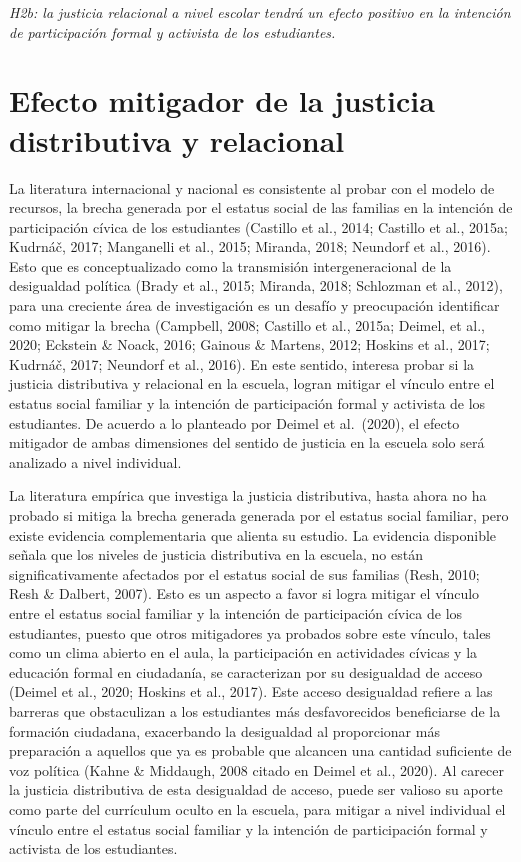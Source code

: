 \documentclass[12pt,twoside]{templates/facsothesis}
\begin{document}
\emph{H2b: la justicia relacional a nivel escolar tendrá un efecto positivo en la intención de participación formal y activista de los estudiantes.}

\hypertarget{efecto-mitigador-de-la-justicia-distributiva-y-relacional}{%
\section{Efecto mitigador de la justicia distributiva y relacional}\label{efecto-mitigador-de-la-justicia-distributiva-y-relacional}}

La literatura internacional y nacional es consistente al probar con el modelo de recursos, la brecha generada por el estatus social de las familias en la intención de participación cívica de los estudiantes (Castillo et al., 2014; Castillo et al., 2015a; Kudrnáč, 2017; Manganelli et al., 2015; Miranda, 2018; Neundorf et al., 2016). Esto que es conceptualizado como la transmisión intergeneracional de la desigualdad política (Brady et al., 2015; Miranda, 2018; Schlozman et al., 2012), para una creciente área de investigación es un desafío y preocupación identificar como mitigar la brecha (Campbell, 2008; Castillo et al., 2015a; Deimel, et al., 2020; Eckstein \& Noack, 2016; Gainous \& Martens, 2012; Hoskins et al., 2017; Kudrnáč, 2017; Neundorf et al., 2016). En este sentido, interesa probar si la justicia distributiva y relacional en la escuela, logran mitigar el vínculo entre el estatus social familiar y la intención de participación formal y activista de los estudiantes. De acuerdo a lo planteado por Deimel et al.~(2020), el efecto mitigador de ambas dimensiones del sentido de justicia en la escuela solo será analizado a nivel individual.

La literatura empírica que investiga la justicia distributiva, hasta ahora no ha probado si mitiga la brecha generada generada por el estatus social familiar, pero existe evidencia complementaria que alienta su estudio. La evidencia disponible señala que los niveles de justicia distributiva en la escuela, no están significativamente afectados por el estatus social de sus familias (Resh, 2010; Resh \& Dalbert, 2007). Esto es un aspecto a favor si logra mitigar el vínculo entre el estatus social familiar y la intención de participación cívica de los estudiantes, puesto que otros mitigadores ya probados sobre este vínculo, tales como un clima abierto en el aula, la participación en actividades cívicas y la educación formal en ciudadanía, se caracterizan por su desigualdad de acceso (Deimel et al., 2020; Hoskins et al., 2017). Este acceso desigualdad refiere a las barreras que obstaculizan a los estudiantes más desfavorecidos beneficiarse de la formación ciudadana, exacerbando la desigualdad al proporcionar más preparación a aquellos que ya es probable que alcancen una cantidad suficiente de voz política (Kahne \& Middaugh, 2008 citado en Deimel et al., 2020). Al carecer la justicia distributiva de esta desigualdad de acceso, puede ser valioso su aporte como parte del currículum oculto en la escuela, para mitigar a nivel individual el vínculo entre el estatus social familiar y la intención de participación formal y activista de los estudiantes.
\end{document}
